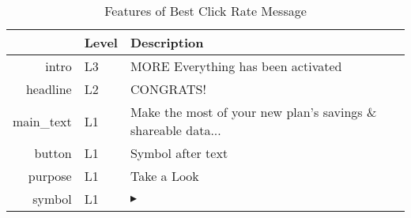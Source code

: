 \begin{table}[ht]
\centering
\caption{Features of Best Click Rate Message} 
\label{tab:best_click}
\begin{tabular}{rll}
  \hline
 & Level & Description \\ 
  \hline
intro & L3 & MORE Everything has been activated \\ 
  headline & L2 & CONGRATS! \\ 
  main\_text & L1 & Make the most of your new plan’s savings \& shareable data... \\ 
  button & L1 & Symbol after text \\ 
  purpose & L1 & Take a Look \\ 
  symbol & L1 & $\blacktriangleright$ \\ 
   \hline
\end{tabular}
\end{table}
